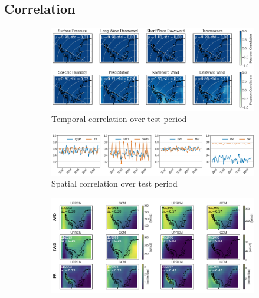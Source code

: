 \documentclass[a4paper,11pt,oneside]{report}
\begin{document}
\subsection{Correlation}
\begin{figure}[tbp]
        \centering
        \begin{subfigure}[b]{\columnwidth}
            \centering \includegraphics[width=\textwidth]{doc/Thesis-latex/images/results/temporalCorr_RCM_GCM.png}
            \caption[]%
            {{\small Temporal correlation over test period}}    
          \label{fig:temp-corr-GCM-UPRCM}
        \end{subfigure}
        \hfill
            \begin{subfigure}[b]{\columnwidth}
            \centering \includegraphics[width=\textwidth]{doc/Thesis-latex/images/results/spatialCorr_TS_RCM_GCM.png}
            \caption[]%
            {{\small Spatial correlation over test period}}    
          \label{fig:spatial-corr-GCM-UPRCM}
        \end{subfigure}
        \hfill
        \begin{subfigure}[b]{\columnwidth}  
            \centering 
            \includegraphics[width=\textwidth]{doc/Thesis-latex/images/results/spatialCorr_RCM_GCM.png}

\end{subfigure}
\end{figure}
\end{document}

